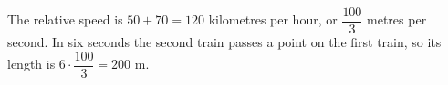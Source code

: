 The relative speed is $50+70=120$ kilometres per hour, or $\dfrac{100}{3}$ metres per second. In six seconds the second train passes a point on the first train, so its length is $6\cdot\dfrac{100}{3}=\boxed{200\text{ m}}$.
